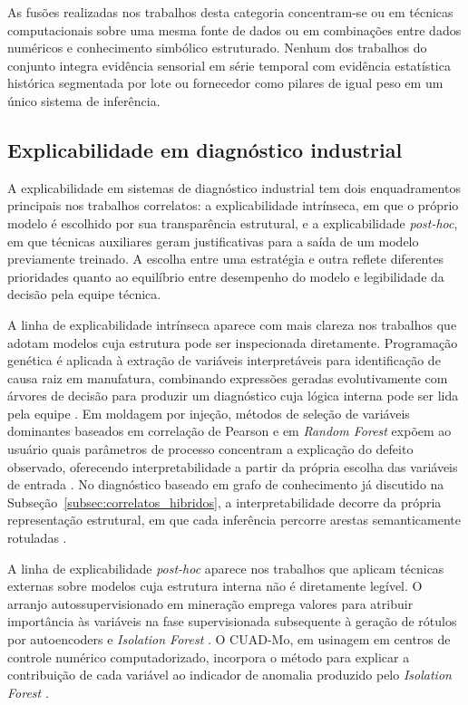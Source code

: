 As fusões realizadas nos trabalhos desta categoria concentram-se ou em técnicas computacionais sobre uma mesma fonte de dados ou em combinações entre dados numéricos e conhecimento simbólico estruturado. Nenhum dos trabalhos do conjunto integra evidência sensorial em série temporal com evidência estatística histórica segmentada por lote ou fornecedor como pilares de igual peso em um único sistema de inferência.


\subsection{Explicabilidade em diagnóstico industrial}
\label{subsec:correlatos_xai}

A explicabilidade em sistemas de diagnóstico industrial tem dois enquadramentos principais nos trabalhos correlatos: a explicabilidade intrínseca, em que o próprio modelo é escolhido por sua transparência estrutural, e a explicabilidade \emph{post-hoc}, em que técnicas auxiliares geram justificativas para a saída de um modelo previamente treinado. A escolha entre uma estratégia e outra reflete diferentes prioridades quanto ao equilíbrio entre desempenho do modelo e legibilidade da decisão pela equipe técnica.

A linha de explicabilidade intrínseca aparece com mais clareza nos trabalhos que adotam modelos cuja estrutura pode ser inspecionada diretamente. Programação genética é aplicada à extração de variáveis interpretáveis para identificação de causa raiz em manufatura, combinando expressões geradas evolutivamente com árvores de decisão para produzir um diagnóstico cuja lógica interna pode ser lida pela equipe \cite{lee2025genetic}. Em moldagem por injeção, métodos de seleção de variáveis dominantes baseados em correlação de Pearson e em \emph{Random Forest} expõem ao usuário quais parâmetros de processo concentram a explicação do defeito observado, oferecendo interpretabilidade a partir da própria escolha das variáveis de entrada \cite{nam2024dominant}. No diagnóstico baseado em grafo de conhecimento já discutido na Subseção~\ref{subsec:correlatos_hibridos}, a interpretabilidade decorre da própria representação estrutural, em que cada inferência percorre arestas semanticamente rotuladas \cite{chen2026rootkgd}.

A linha de explicabilidade \emph{post-hoc} aparece nos trabalhos que aplicam técnicas externas sobre modelos cuja estrutura interna não é diretamente legível. O arranjo autossupervisionado em mineração emprega valores  para atribuir importância às variáveis na fase supervisionada subsequente à geração de rótulos por autoencoders e \emph{Isolation Forest} \cite{islam2026explainable}. O CUAD-Mo, em usinagem em centros de controle numérico computadorizado, incorpora o método  para explicar a contribuição de cada variável ao indicador de anomalia produzido pelo \emph{Isolation Forest} \cite{lorenti2022cuadmo}.

